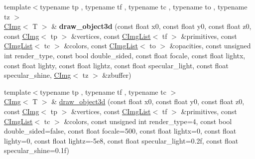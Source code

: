 \begin{DoxyCompactItemize}
\item 
\hypertarget{structcimg__library_1_1CImg_aac68959a9c08ba90b7ab6b0cb875abe0}{
{\footnotesize template$<$typename tp , typename tf , typename tc , typename to , typename tz $>$ }\\\hyperlink{structcimg__library_1_1CImg}{CImg}$<$ T $>$ \& {\bfseries draw\_\-object3d} (const float x0, const float y0, const float z0, const \hyperlink{structcimg__library_1_1CImg}{CImg}$<$ tp $>$ \&vertices, const \hyperlink{structcimg__library_1_1CImgList}{CImgList}$<$ tf $>$ \&primitives, const \hyperlink{structcimg__library_1_1CImgList}{CImgList}$<$ tc $>$ \&colors, const \hyperlink{structcimg__library_1_1CImgList}{CImgList}$<$ to $>$ \&opacities, const unsigned int render\_\-type, const bool double\_\-sided, const float focale, const float lightx, const float lighty, const float lightz, const float specular\_\-light, const float specular\_\-shine, \hyperlink{structcimg__library_1_1CImg}{CImg}$<$ tz $>$ \&zbuffer)}
\label{structcimg__library_1_1CImg_aac68959a9c08ba90b7ab6b0cb875abe0}

\item 
\hypertarget{structcimg__library_1_1CImg_a5bcb685ee6ec5e7c56d4aa326f9b4394}{
{\footnotesize template$<$typename tp , typename tf , typename tc $>$ }\\\hyperlink{structcimg__library_1_1CImg}{CImg}$<$ T $>$ \& \hyperlink{structcimg__library_1_1CImg_a5bcb685ee6ec5e7c56d4aa326f9b4394}{draw\_\-object3d} (const float x0, const float y0, const float z0, const \hyperlink{structcimg__library_1_1CImg}{CImg}$<$ tp $>$ \&vertices, const \hyperlink{structcimg__library_1_1CImgList}{CImgList}$<$ tf $>$ \&primitives, const \hyperlink{structcimg__library_1_1CImgList}{CImgList}$<$ tc $>$ \&colors, const unsigned int render\_\-type=4, const bool double\_\-sided=false, const float focale=500, const float lightx=0, const float lighty=0, const float lightz=-\/5e8, const float specular\_\-light=0.2f, const float specular\_\-shine=0.1f)}
\label{structcimg__library_1_1CImg_a5bcb685ee6ec5e7c56d4aa326f9b4394}


\end{DoxyCompactItemize}
